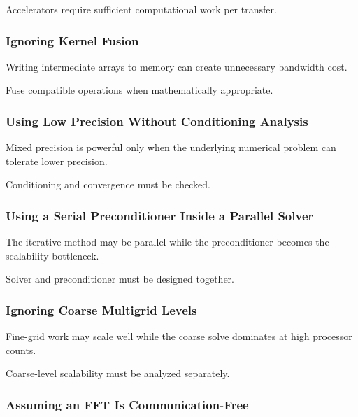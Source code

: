 Accelerators require sufficient computational work per transfer.

\subsubsection{Ignoring Kernel Fusion}

Writing intermediate arrays to memory can create unnecessary bandwidth
cost.

Fuse compatible operations when mathematically appropriate.

\subsubsection{Using Low Precision Without Conditioning Analysis}

Mixed precision is powerful only when the underlying numerical problem can
tolerate lower precision.

Conditioning and convergence must be checked.

\subsubsection{Using a Serial Preconditioner Inside a Parallel Solver}

The iterative method may be parallel while the preconditioner becomes the
scalability bottleneck.

Solver and preconditioner must be designed together.

\subsubsection{Ignoring Coarse Multigrid Levels}

Fine-grid work may scale well while the coarse solve dominates at high
processor counts.

Coarse-level scalability must be analyzed separately.

\subsubsection{Assuming an FFT Is Communication-Free}

